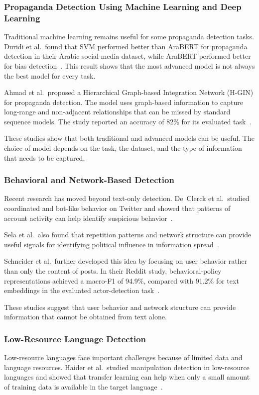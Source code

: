 \documentclass[12pt,a4paper]{report}
\begin{document}
\subsubsection*{Propaganda Detection Using Machine Learning and Deep Learning}
Traditional machine learning remains useful for some propaganda detection tasks.
Duridi et al.\ found that SVM performed better than AraBERT for propaganda
detection in their Arabic social-media dataset, while AraBERT performed better for
bias detection~\cite{duridi2025}. This result shows that the most advanced model is
not always the best model for every task.

Ahmad et al.\ proposed a Hierarchical Graph-based Integration Network (H-GIN) for
propaganda detection. The model uses graph-based information to capture long-range
and non-adjacent relationships that can be missed by standard sequence models. The
study reported an accuracy of 82\% for its evaluated task~\cite{ahmad2025}.

These studies show that both traditional and advanced models can be useful. The
choice of model depends on the task, the dataset, and the type of information that
needs to be captured.

\subsubsection*{Behavioral and Network-Based Detection}
Recent research has moved beyond text-only detection. De~Clerck et al.\ studied
coordinated and bot-like behavior on Twitter and showed that patterns of account
activity can help identify suspicious behavior~\cite{declerck2024}.

Sela et al.\ also found that repetition patterns and network structure can provide
useful signals for identifying political influence in information
spread~\cite{sela2025}.

Schneider et al.\ further developed this idea by focusing on user behavior rather
than only the content of posts. In their Reddit study, behavioral-policy
representations achieved a macro-F1 of 94.9\%, compared with 91.2\% for text
embeddings in the evaluated actor-detection task~\cite{schneider2026}.

These studies suggest that user behavior and network structure can provide
information that cannot be obtained from text alone.

\subsubsection*{Low-Resource Language Detection}
Low-resource languages face important challenges because of limited data and
language resources. Haider et al.\ studied manipulation detection in low-resource
languages and showed that transfer learning can help when only a small amount of
training data is available in the target language~\cite{haider2020}.
\end{document}
